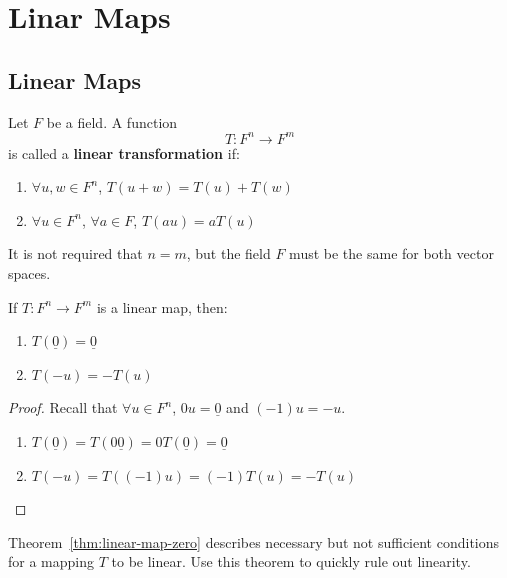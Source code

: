 \chapter{Linar Maps}

\section{Linear Maps}

\begin{definition}\label{def:linear-transformation} Let
$F$ be a field. A function \[ T: F^n \to F^m \] is called a \textbf{linear
transformation} if: \begin{enumerate}[label=(\roman*)] \item $\forall u, w \in
F^n$, $T(u + w) = T(u) + T(w)$ \item $\forall u \in F^n$, $\forall a \in F$,
$T(au) = aT(u)$ \end{enumerate} \end{definition}

\begin{note} It is not required that $n = m$, but the field $F$ must be the
same for both vector spaces. \end{note}

\begin{theorem}\label{thm:linear-map-zero} If $T: F^n \to F^m$ is a linear map,
then: \begin{enumerate}[label=(\roman*)] \item $T(\underline{0}) =
\underline{0}$ \item $T(-u) = -T(u)$ \end{enumerate} \end{theorem}

\begin{proof} Recall that $\forall u \in F^n$, $0u = \underline{0}$ and $(-1)u
= -u$. \begin{enumerate}[label=(\roman*)] \item $T(\underline{0}) =
T(0\underline{0}) = 0T(\underline{0}) = \underline{0}$ \item $T(-u) = T((-1)u) =
(-1)T(u) = -T(u)$ \end{enumerate} \end{proof}

\begin{note} Theorem~\ref{thm:linear-map-zero} describes necessary but not
sufficient conditions for a mapping $T$ to be linear. Use this theorem to
quickly rule out linearity. \end{note}


